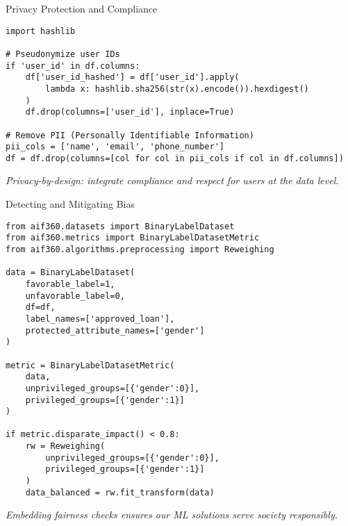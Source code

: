 \documentclass[aspectratio=169]{beamer}
\begin{document}
\begin{frame}{Privacy Protection and Compliance}
\begin{verbatim}
import hashlib

# Pseudonymize user IDs
if 'user_id' in df.columns:
    df['user_id_hashed'] = df['user_id'].apply(
        lambda x: hashlib.sha256(str(x).encode()).hexdigest()
    )
    df.drop(columns=['user_id'], inplace=True)

# Remove PII (Personally Identifiable Information)
pii_cols = ['name', 'email', 'phone_number']
df = df.drop(columns=[col for col in pii_cols if col in df.columns])
\end{verbatim}

\emph{Privacy-by-design: integrate compliance and respect for users at the data level.}
\end{frame}


\begin{frame}{Detecting and Mitigating Bias}
\begin{verbatim}
from aif360.datasets import BinaryLabelDataset
from aif360.metrics import BinaryLabelDatasetMetric
from aif360.algorithms.preprocessing import Reweighing

data = BinaryLabelDataset(
    favorable_label=1,
    unfavorable_label=0,
    df=df,
    label_names=['approved_loan'],
    protected_attribute_names=['gender']
)

metric = BinaryLabelDatasetMetric(
    data,
    unprivileged_groups=[{'gender':0}],
    privileged_groups=[{'gender':1}]
)

if metric.disparate_impact() < 0.8:
    rw = Reweighing(
        unprivileged_groups=[{'gender':0}],
        privileged_groups=[{'gender':1}]
    )
    data_balanced = rw.fit_transform(data)
\end{verbatim}

\emph{Embedding fairness checks ensures our ML solutions serve society responsibly.}
\end{frame}
\end{document}
